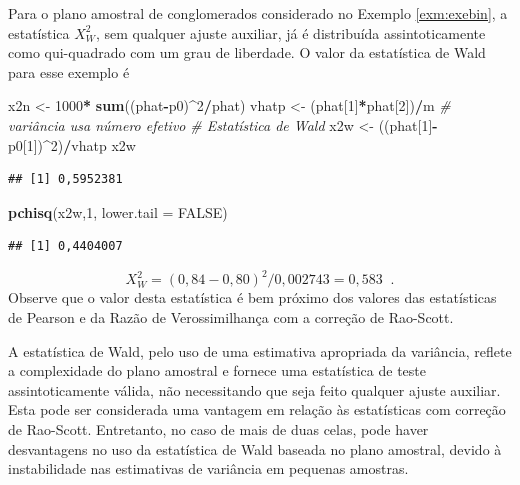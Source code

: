 \documentclass[]{book}
\newenvironment{Shaded}{\begin{snugshade}}{\end{snugshade}}
\newcommand{\KeywordTok}[1]{\textcolor[rgb]{0.13,0.29,0.53}{\textbf{#1}}}
\newcommand{\DataTypeTok}[1]{\textcolor[rgb]{0.13,0.29,0.53}{#1}}
\newcommand{\DecValTok}[1]{\textcolor[rgb]{0.00,0.00,0.81}{#1}}
\newcommand{\StringTok}[1]{\textcolor[rgb]{0.31,0.60,0.02}{#1}}
\newcommand{\CommentTok}[1]{\textcolor[rgb]{0.56,0.35,0.01}{\textit{#1}}}
\newcommand{\OtherTok}[1]{\textcolor[rgb]{0.56,0.35,0.01}{#1}}
\newcommand{\OperatorTok}[1]{\textcolor[rgb]{0.81,0.36,0.00}{\textbf{#1}}}
\newcommand{\NormalTok}[1]{#1}
\theoremstyle{definition}
\theoremstyle{definition}
\theoremstyle{definition}
\theoremstyle{remark}
\begin{document}
Para o plano amostral de conglomerados considerado no Exemplo
\ref{exm:exebin}, a estatística \(X_{W}^{2}\), sem qualquer ajuste
auxiliar, já é distribuída assintoticamente como qui-quadrado com um
grau de liberdade. O valor da estatística de Wald para esse exemplo é

\begin{Shaded}
\begin{Highlighting}[]
\NormalTok{x2n <-}\StringTok{ }\DecValTok{1000}\OperatorTok{*}\StringTok{ }\KeywordTok{sum}\NormalTok{((phat}\OperatorTok{-}\NormalTok{p0)}\OperatorTok{^}\DecValTok{2}\OperatorTok{/}\NormalTok{phat)}
\NormalTok{vhatp <-}\StringTok{ }\NormalTok{(phat[}\DecValTok{1}\NormalTok{]}\OperatorTok{*}\NormalTok{phat[}\DecValTok{2}\NormalTok{])}\OperatorTok{/}\NormalTok{m }\CommentTok{# variância usa número efetivo}
\CommentTok{# Estatística de Wald}
\NormalTok{x2w <-}\StringTok{ }\NormalTok{((phat[}\DecValTok{1}\NormalTok{]}\OperatorTok{-}\NormalTok{p0[}\DecValTok{1}\NormalTok{])}\OperatorTok{^}\DecValTok{2}\NormalTok{)}\OperatorTok{/}\NormalTok{vhatp}
\NormalTok{x2w}
\end{Highlighting}
\end{Shaded}

\begin{verbatim}
## [1] 0,5952381
\end{verbatim}

\begin{Shaded}
\begin{Highlighting}[]
\KeywordTok{pchisq}\NormalTok{(x2w,}\DecValTok{1}\NormalTok{, }\DataTypeTok{lower.tail =} \OtherTok{FALSE}\NormalTok{)}
\end{Highlighting}
\end{Shaded}

\begin{verbatim}
## [1] 0,4404007
\end{verbatim}

\[
X_{W}^{2}=\left( 0,84-0,80\right) ^{2}/0,002743=0,583\;\;\mbox{.} 
\] Observe que o valor desta estatística é bem próximo dos valores das
estatísticas de Pearson e da Razão de Verossimilhança com a correção de
Rao-Scott.

A estatística de Wald, pelo uso de uma estimativa apropriada da
variância, reflete a complexidade do plano amostral e fornece uma
estatística de teste assintoticamente válida, não necessitando que seja
feito qualquer ajuste auxiliar. Esta pode ser considerada uma vantagem
em relação às estatísticas com correção de Rao-Scott. Entretanto, no
caso de mais de duas celas, pode haver desvantagens no uso da
estatística de Wald baseada no plano amostral, devido à instabilidade
nas estimativas de variância em pequenas amostras.
\end{document}

